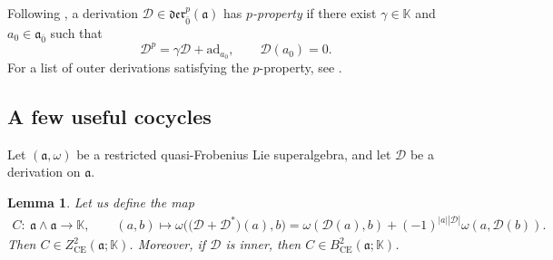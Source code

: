 \documentclass[10pt,a4paper]{amsart}
\numberwithin{equation}{section}
\newtheorem{Lemma}[Theorem]{Lemma}
\begin{document}
Following \cite{BBH}, a derivation $\mathscr{D}\in \mathfrak{der}^p_{\bar 0}(\mathfrak{a})$ has \textit{$p$-property} if there exist $\gamma \in \mathbb{K}$ and $a_0\in \mathfrak{a}_{\bar 0}$ such that
\begin{equation}
\label{SConp}
\mathscr{D}^p=\gamma \mathscr{D}+\mathrm{ad}_{a_0},\qquad
\mathscr{D}(a_0)=0.
\end{equation}
For a list of outer derivations satisfying the $p$-property, see \cite{BBH}.
\subsection{A few useful cocycles} Let $(\mathfrak{a}, \omega)$ be a restricted quasi-Frobenius Lie superalgebra, and let ${\mathscr D}$ be a derivation on $\mathfrak{a}$.
\begin{Lemma}\label{Ccocycle}
Let us define the map
\begin{gather} \label{CEcocycle}
C\colon\ \mathfrak{a}\wedge \mathfrak{a} \rightarrow \mathbb K,\qquad (a,b)\mapsto \omega\bigl(\bigl({\mathscr D}+{\mathscr D}^*\bigr)(a),b\bigr)=\omega({\mathscr D}(a), b) +(-1)^{|a||\mathscr{D}|}\omega(a,{\mathscr D}(b)).
\end{gather}
Then $C\in Z^2_{\mathrm{CE}}(\mathfrak{a}; \mathbb{K})$. Moreover, if $\mathscr D$ is inner, then $C\in B^2_{\mathrm{CE}}(\mathfrak{a}; \mathbb{K})$.
\end{Lemma}
\end{document}
